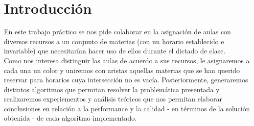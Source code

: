 \section{Introducción}
En este trabajo práctico se nos pide colaborar en la asignación de aulas con diversos recursos a un conjunto de materias (con un horario establecido e invariable) que necesitarían hacer uso de ellos durante el dictado de clase.\\
Como nos interesa distinguir las aulas de acuerdo a sus recursos, le asignaremos a cada una un color y uniremos con aristas aquellas materias que se han querido reservar para horarios cuya intersección no es vacía. Posteriormente, generaremos distintos algoritmos que permitan resolver la problemática presentada y realizaremos experiementos y análisis teóricos que nos permitan elaborar conclusiones en relación a la performance y la calidad - en términos de la solución obtenida - de cada algoritmo implementado.
